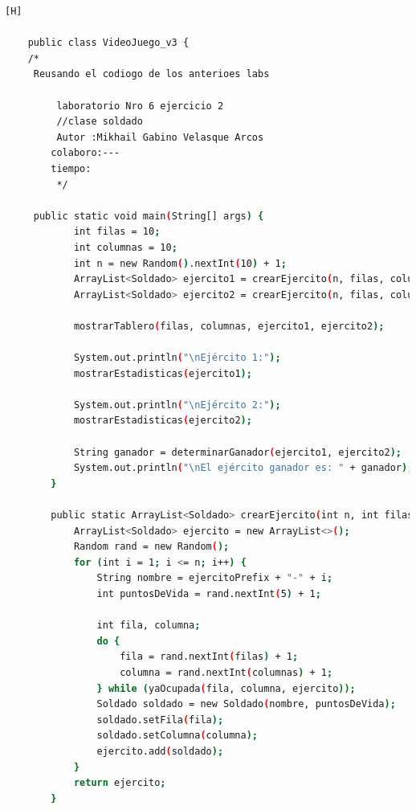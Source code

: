 \documentclass{article}
\begin{document}
	\begin{lstlisting}[language=bash,caption={Creando la clase principal de VideoJuego_v3.java}][H]
	
	public class VideoJuego_v3 {
	/*
	 Reusando el codiogo de los anterioes labs
	
		 laboratorio Nro 6 ejercicio 2
		 //clase soldado
		 Autor :Mikhail Gabino Velasque Arcos
		colaboro:---
		tiempo:
		 */

	 public static void main(String[] args) {
	        int filas = 10; 
	        int columnas = 10; 
	        int n = new Random().nextInt(10) + 1; 
	        ArrayList<Soldado> ejercito1 = crearEjercito(n, filas, columnas, "E1");
	        ArrayList<Soldado> ejercito2 = crearEjercito(n, filas, columnas, "E2");

	        mostrarTablero(filas, columnas, ejercito1, ejercito2);

	        System.out.println("\nEjército 1:");
	        mostrarEstadisticas(ejercito1);

	        System.out.println("\nEjército 2:");
	        mostrarEstadisticas(ejercito2);

	        String ganador = determinarGanador(ejercito1, ejercito2);
	        System.out.println("\nEl ejército ganador es: " + ganador);
	    }

	    public static ArrayList<Soldado> crearEjercito(int n, int filas, int columnas, String ejercitoPrefix) {
	        ArrayList<Soldado> ejercito = new ArrayList<>();
	        Random rand = new Random();
	        for (int i = 1; i <= n; i++) {
	            String nombre = ejercitoPrefix + "-" + i; 
	            int puntosDeVida = rand.nextInt(5) + 1; 

	            int fila, columna;
	            do {
	                fila = rand.nextInt(filas) + 1;
	                columna = rand.nextInt(columnas) + 1;
	            } while (yaOcupada(fila, columna, ejercito));
	            Soldado soldado = new Soldado(nombre, puntosDeVida);
	            soldado.setFila(fila);
	            soldado.setColumna(columna);
	            ejercito.add(soldado);
	        }
	        return ejercito;
	    }


\end{lstlisting}
\end{document}
